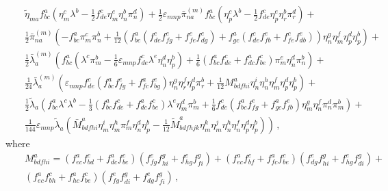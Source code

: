 \documentclass[a4paper,10pt]{article}
\begin{document}
\begin{eqnarray}
&&\tilde{\eta}_{ma}f_{bc}^{a}\left( \eta _{m}^{c}\lambda ^{b}-\frac{1}{2}%
f_{de}^{c}\eta _{m}^{e}\eta _{n}^{b}\pi _{n}^{d}\right) +\frac{1}{2}%
\varepsilon _{mnp}\bar{\pi}_{na}^{(m)}f_{bc}^{a}\left( \eta _{p}^{c}\lambda
^{b}-\frac{1}{2}f_{de}^{c}\eta _{p}^{e}\eta _{r}^{b}\pi _{r}^{d}\right) + 
\nonumber \\
&&\frac{1}{2}\bar{\pi}_{na}^{(m)}\left( -f_{bc}^{a}\pi _{m}^{c}\pi _{n}^{b}+%
\frac{1}{12}\left( f_{bc}^{a}\left(
f_{de}^{c}f_{fg}^{e}+f_{fe}^{c}f_{dg}^{e}\right) +f_{gc}^{a}\left(
f_{de}^{c}f_{fb}^{e}+f_{fe}^{c}f_{db}^{e}\right) \right) \eta _{n}^{g}\eta
_{m}^{f}\eta _{p}^{d}\eta _{p}^{b}\right) +  \nonumber \\
&&\frac{1}{2}\bar{\lambda}_{a}^{(m)}\left( f_{bc}^{a}\left( \lambda ^{c}\pi
_{m}^{b}-\frac{1}{6}\varepsilon _{mnp}f_{de}^{c}\lambda ^{e}\eta
_{n}^{d}\eta _{p}^{b}\right) +\frac{1}{6}\left(
f_{bc}^{a}f_{de}^{c}+f_{dc}^{a}f_{be}^{c}\right) \pi _{m}^{e}\eta
_{n}^{d}\pi _{n}^{b}\right) +  \nonumber \\
&&\frac{1}{24}\bar{\lambda}_{a}^{(m)}\left( \varepsilon
_{mnp}f_{de}^{c}\left( f_{bc}^{a}f_{fg}^{e}+f_{fc}^{a}f_{bg}^{e}\right) \eta
_{n}^{g}\eta _{r}^{f}\eta _{p}^{d}\pi _{r}^{b}+\frac{1}{12}M_{bdfhi}^{a}\eta
_{n}^{i}\eta _{n}^{h}\eta _{m}^{f}\eta _{p}^{d}\eta _{p}^{b}\right) + 
\nonumber \\
&&\frac{1}{2}\tilde{\lambda}_{a}\left( f_{bc}^{a}\lambda ^{c}\lambda ^{b}-%
\frac{1}{3}\left( f_{bc}^{a}f_{de}^{c}+f_{dc}^{a}f_{be}^{c}\right) \lambda
^{e}\eta _{m}^{d}\pi _{m}^{b}+\frac{1}{6}f_{de}^{c}\left(
f_{bc}^{a}f_{fg}^{e}+f_{gc}^{a}f_{fb}^{e}\right) \eta _{m}^{g}\eta
_{n}^{f}\pi _{n}^{d}\pi _{m}^{b}\right) +  \nonumber \\
&&\left. \frac{1}{144}\varepsilon _{mnp}\tilde{\lambda}_{a}\left( \bar{M}%
_{bdfhi}^{a}\eta _{m}^{i}\eta _{m}^{h}\pi _{m}^{f}\eta _{n}^{d}\eta _{p}^{b}-%
\frac{1}{12}\tilde{M}_{bdfhjk}^{a}\eta _{m}^{k}\eta _{m}^{j}\eta
_{n}^{h}\eta _{n}^{f}\eta _{p}^{d}\eta _{p}^{b}\right) \right) \,,
\end{eqnarray}
where 
\begin{eqnarray}
\label{22}
&&M_{bdfhi}^{a}=\left( f_{ec}^{a}f_{bd}^{c}+f_{dc}^{a}f_{be}^{c}\right)
\left( f_{fg}^{e}f_{hi}^{g}+f_{hg}^{e}f_{fi}^{g}\right) +\left(
f_{ec}^{a}f_{bf}^{c}+f_{fc}^{a}f_{be}^{c}\right) \left(
f_{dg}^{e}f_{hi}^{g}+f_{hg}^{e}f_{di}^{g}\right) +  \nonumber \\
&&\left( f_{ec}^{a}f_{bh}^{c}+f_{hc}^{a}f_{be}^{c}\right) \left(
f_{fg}^{e}f_{di}^{g}+f_{dg}^{e}f_{fi}^{g}\right) \,,
\end{eqnarray}
\end{document}
